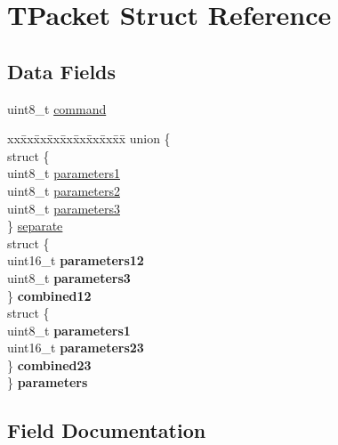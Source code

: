 \hypertarget{struct_t_packet}{}\section{T\+Packet Struct Reference}
\label{struct_t_packet}
\subsection*{Data Fields}
\begin{DoxyCompactItemize}
\item 
uint8\+\_\+t \hyperlink{struct_t_packet_a5cec09aa383544e7b1413e08205d09ea}{command}
\item 
\hypertarget{struct_t_packet_a07bb70dfa707335b90cbf39d28009d8d}{}\begin{tabbing}
xx\=xx\=xx\=xx\=xx\=xx\=xx\=xx\=xx\=\kill
union \{\\
\>struct \{\\
\>\>uint8\_t \hyperlink{struct_t_packet_a520692e561b74732ec56a316f26ee04a}{parameters1}\\
\>\>uint8\_t \hyperlink{struct_t_packet_a618c0f45bfab42f767d2cc716059ae69}{parameters2}\\
\>\>uint8\_t \hyperlink{struct_t_packet_a202cb1f3110b6077bfe1c3dd23a6af62}{parameters3}\\
\>\} \hyperlink{struct_t_packet_ac006ca77d7e0c5226e0ae2500c28308b}{separate}\\
\>struct \{\\
\>\>uint16\_t {\bfseries parameters12}\\
\>\>uint8\_t {\bfseries parameters3}\\
\>\} {\bfseries combined12}\\
\>struct \{\\
\>\>uint8\_t {\bfseries parameters1}\\
\>\>uint16\_t {\bfseries parameters23}\\
\>\} {\bfseries combined23}\\
\} {\bfseries parameters}\label{struct_t_packet_a07bb70dfa707335b90cbf39d28009d8d}
\\

\end{tabbing}\end{DoxyCompactItemize}


\subsection{Field Documentation}
\hypertarget{struct_t_packet_a5cec09aa383544e7b1413e08205d09ea}{}
